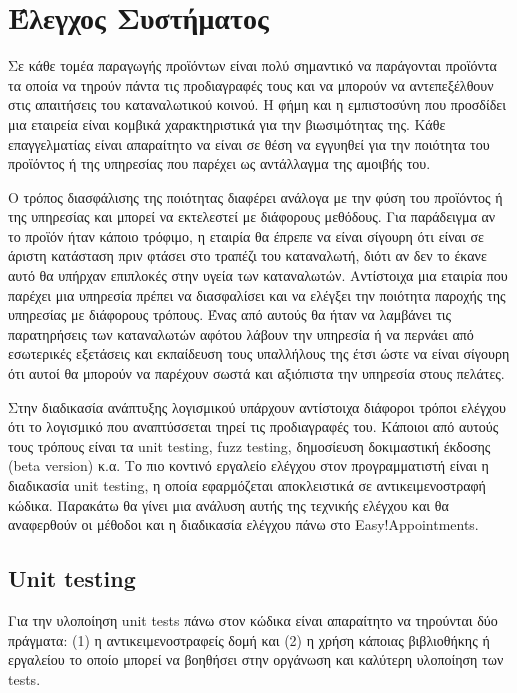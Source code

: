 
\chapter{Έλεγχος Συστήματος}
Σε κάθε τομέα παραγωγής προϊόντων είναι πολύ σημαντικό να παράγονται προϊόντα τα οποία να τηρούν πάντα τις προδιαγραφές τους και να μπορούν να αντεπεξέλθουν στις απαιτήσεις του καταναλωτικού κοινού. Η φήμη και η εμπιστοσύνη που προσδίδει μια εταιρεία είναι κομβικά χαρακτηριστικά για την βιωσιμότητας της. Κάθε επαγγελματίας είναι απαραίτητο να είναι σε θέση να εγγυηθεί για την ποιότητα του προϊόντος ή της υπηρεσίας που παρέχει ως αντάλλαγμα της αμοιβής του.

Ο τρόπος διασφάλισης της ποιότητας διαφέρει ανάλογα με την φύση του προϊόντος ή της υπηρεσίας και μπορεί να εκτελεστεί με διάφορους μεθόδους. Για παράδειγμα αν το προϊόν ήταν κάποιο τρόφιμο, η εταιρία θα έπρεπε να είναι σίγουρη ότι είναι σε άριστη κατάσταση πριν φτάσει στο τραπέζι του καταναλωτή, διότι αν δεν το έκανε αυτό θα υπήρχαν επιπλοκές στην υγεία των καταναλωτών. Αντίστοιχα μια εταιρία που παρέχει μια υπηρεσία πρέπει να διασφαλίσει και να ελέγξει την ποιότητα παροχής της υπηρεσίας με διάφορους τρόπους. Ένας από αυτούς θα ήταν να λαμβάνει τις παρατηρήσεις των καταναλωτών αφότου λάβουν την υπηρεσία ή να περνάει από εσωτερικές εξετάσεις και εκπαίδευση τους υπαλλήλους της έτσι ώστε να είναι σίγουρη ότι αυτοί θα μπορούν να παρέχουν σωστά και αξιόπιστα την υπηρεσία στους πελάτες.

Στην διαδικασία ανάπτυξης λογισμικού υπάρχουν αντίστοιχα διάφοροι τρόποι ελέγχου ότι το λογισμικό που αναπτύσσεται τηρεί τις προδιαγραφές του. Κάποιοι από αυτούς τους τρόπους είναι τα unit testing, fuzz testing, δημοσίευση δοκιμαστική έκδοσης (beta version) κ.α. Το πιο κοντινό εργαλείο ελέγχου στον προγραμματιστή είναι η διαδικασία unit testing, η οποία εφαρμόζεται αποκλειστικά σε αντικειμενοστραφή κώδικα. Παρακάτω θα γίνει μια ανάλυση αυτής της τεχνικής ελέγχου και θα αναφερθούν οι μέθοδοι και η διαδικασία ελέγχου πάνω στο Easy!Appointments.

\section {Unit testing}
Για την υλοποίηση unit tests πάνω στον κώδικα είναι απαραίτητο να τηρούνται δύο πράγματα: (1) η αντικειμενοστραφείς δομή και (2) η χρήση κάποιας βιβλιοθήκης ή εργαλείου το οποίο μπορεί να βοηθήσει στην οργάνωση και καλύτερη υλοποίηση των tests.

